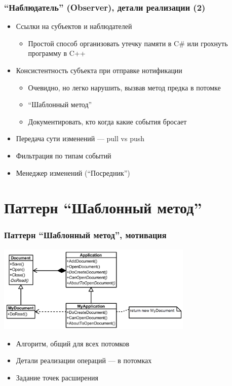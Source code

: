\documentclass[xetex,mathserif,serif]{beamer}
\begin{document}
    \begin{frame}
        \frametitle{``Наблюдатель'' (Observer), детали реализации (2)}
        \begin{itemize}
            \item Ссылки на субъектов и наблюдателей
            \begin{itemize}
                \item Простой способ организовать утечку памяти в C\# или грохнуть программу в C++
            \end{itemize}
            \item Консистентность субъекта при отправке нотификации
            \begin{itemize}
                \item Очевидно, но легко нарушить, вызвав метод предка в потомке
                \item ``Шаблонный метод''
                \item Документировать, кто когда какие события бросает
            \end{itemize}
            \item Передача сути изменений --- pull vs push
            \item Фильтрация по типам событий
            \item Менеджер изменений (``Посредник'')
        \end{itemize}
    \end{frame}

    \section{Паттерн ``Шаблонный метод''}

    \begin{frame}
        \frametitle{Паттерн ``Шаблонный метод'', мотивация}
        \begin{center}
            \includegraphics[width=0.7\textwidth]{templateMethodMotivation.png}
        \end{center}
        \begin{itemize}
            \item Алгоритм, общий для всех потомков
            \item Детали реализации операций --- в потомках
            \item Задание точек расширения
        \end{itemize}
    \end{frame}
\end{document}
